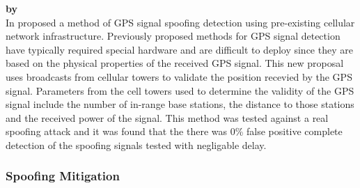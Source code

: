 \medskip

\textbf{\emph{} by \citeauthor{RN42}} \\
In \citeyear{RN42} \citeauthor{RN42} \cite{RN42} proposed a method of GPS signal spoofing detection using pre-existing cellular network infrastructure. Previously
proposed methods for GPS signal detection have typically required special hardware and are difficult to deploy since they are based on the physical properties of the
received GPS signal. This new proposal uses broadcasts from cellular towers to validate the position recevied by the GPS signal. Parameters from the cell towers used to
determine the validity of the GPS signal include the number of in-range base stations, the distance to those stations and the received power of the signal. This method
was tested against a real spoofing attack and it was found that the there was 0\% false positive complete detection of the spoofing signals tested with negligable delay.


\subsubsection{Spoofing Mitigation}

